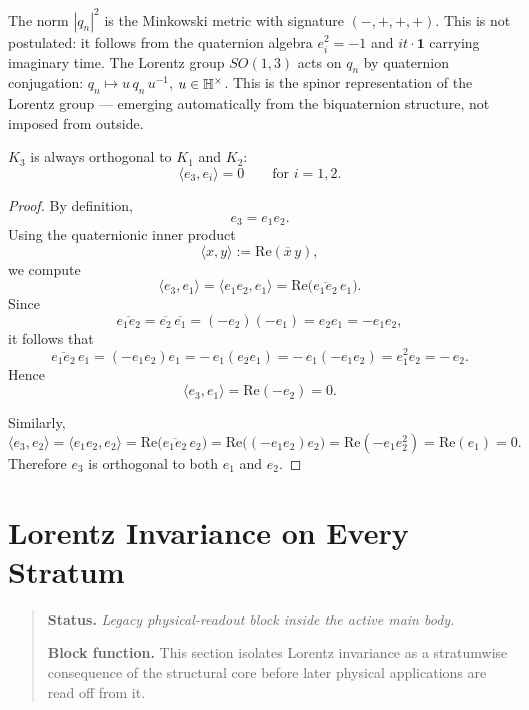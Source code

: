 \begin{remark}
The norm $|q_n|^2$ is the Minkowski metric with signature $(-,+,+,+)$.
This is not postulated: it follows from the quaternion algebra $e_i^2=-1$
and $it\cdot\mathbf{1}$ carrying imaginary time.
The Lorentz group $SO(1,3)$ acts on $q_n$ by quaternion conjugation:
$q_n\mapsto u\,q_n\,u^{-1}$, $u\in\mathbb{H}^\times$.
This is the spinor representation of the Lorentz group --- emerging
automatically from the biquaternion structure, not imposed from outside.
\end{remark}

\begin{proposition}
\label{prop:orthogonality-third-kernel}
$K_3$ is always orthogonal to $K_1$ and $K_2$:
\[
\langle e_3,e_i\rangle = 0 \qquad \text{for } i=1,2.
\]
\end{proposition}

\begin{proof}
By definition,
\[
e_3 = e_1 e_2.
\]
Using the quaternionic inner product
\[
\langle x,y\rangle := \mathrm{Re}(\overline{x}\,y),
\]
we compute
\[
\langle e_3,e_1\rangle
=
\langle e_1e_2,e_1\rangle
=
\mathrm{Re}\!\bigl(\overline{e_1e_2}\,e_1\bigr).
\]
Since
\[
\overline{e_1e_2}=\overline{e_2}\,\overline{e_1}=(-e_2)(-e_1)=e_2e_1=-e_1e_2,
\]
it follows that
\[
\overline{e_1e_2}\,e_1
=
(-e_1e_2)e_1
=
-\,e_1(e_2e_1)
=
-\,e_1(-e_1e_2)
=
e_1^2 e_2
=
-\,e_2.
\]
Hence
\[
\langle e_3,e_1\rangle
=
\mathrm{Re}(-e_2)=0.
\]

Similarly,
\[
\langle e_3,e_2\rangle
=
\langle e_1e_2,e_2\rangle
=
\mathrm{Re}\!\bigl(\overline{e_1e_2}\,e_2\bigr)
=
\mathrm{Re}\!\bigl((-e_1e_2)e_2\bigr)
=
\mathrm{Re}(-e_1 e_2^2)
=
\mathrm{Re}(e_1)=0.
\]
Therefore $e_3$ is orthogonal to both $e_1$ and $e_2$.
\end{proof}


\section{Lorentz Invariance on Every Stratum}
\begin{quote}\small
\noindent\textbf{Status.} \emph{Legacy physical-readout block inside the active main body.}\par
\noindent\textbf{Block function.} This section isolates Lorentz invariance as a stratumwise consequence of the structural core before later physical applications are read off from it.
\end{quote}
\label{sec:lorentz}

